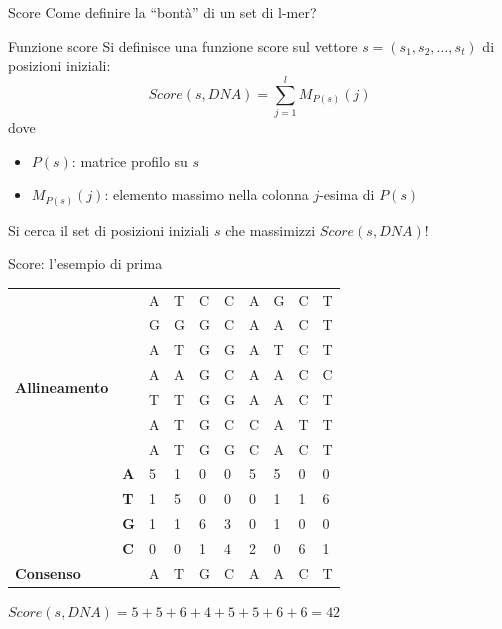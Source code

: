 \begin{frame}{Score}
	Come definire la ``bontà'' di un set di l-mer?
	\begin{block}{Funzione score}
		Si definisce una funzione score sul vettore $s=(s_1,s_2,\dots,s_t)$ di posizioni iniziali:
		\begin{equation*}
			Score(s,DNA)=\sum_{j=1}^{l}M_{P(s)}(j)
		\end{equation*}
		dove
		\begin{itemize}
			\item $P(s)$: matrice profilo su $s$
			\item $M_{P(s)}(j)$: elemento massimo nella colonna $j$-esima di $P(s)$
		\end{itemize}
	\end{block}
	Si cerca il set di posizioni iniziali $s$ che massimizzi $Score(s,DNA)$!
\end{frame}

\begin{frame}{Score: l'esempio di prima}
	\begin{center}
		\begin{tabular}{l l l l l l l l l l}
			\multirow{8}{*}{\textbf{Allineamento}} & & A & T & C & C & A & G & C & T\\
			& & G & G & G & C & A & A & C & T\\
			& & A & T & G & G & A & T & C & T\\
			& & A & A & G & C & A & A & C & C\\
			& & T & T & G & G & A & A & C & T\\
			& & A & T & G & C & C & A & T & T\\
			& & A & T & G & G & C & A & C & T\\
			\hline
			\multirow{4}{*}{\textbf{Profilo}} & \textbf{A} & 5 & 1 & 0 & 0 & 5 & 5 & 0 & 0\\
			& \textbf{T} & 1 & 5 & 0 & 0 & 0 & 1 & 1 & 6\\
			& \textbf{G} & 1 & 1 & 6 & 3 & 0 & 1 & 0 & 0\\
			& \textbf{C} & 0 & 0 & 1 & 4 & 2 & 0 & 6 & 1\\
			\hline
			\textbf{Consenso} & & A & T & G & C & A & A & C & T 
		\end{tabular}
	\end{center}
	$Score(s,DNA) = 5+5+6+4+5+5+6+6=42$
\end{frame}

